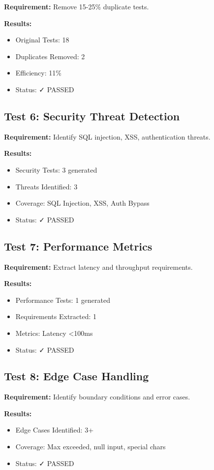 \documentclass[12pt,oneside]{report}
\begin{document}
\textbf{Requirement:} Remove 15-25\% duplicate tests.

\textbf{Results:}
\begin{itemize}
    \item Original Tests: 18
    \item Duplicates Removed: 2
    \item Efficiency: 11\%
    \item Status: ✓ PASSED
\end{itemize}

\subsection{Test 6: Security Threat Detection}

\textbf{Requirement:} Identify SQL injection, XSS, authentication threats.

\textbf{Results:}
\begin{itemize}
    \item Security Tests: 3 generated
    \item Threats Identified: 3
    \item Coverage: SQL Injection, XSS, Auth Bypass
    \item Status: ✓ PASSED
\end{itemize}

\subsection{Test 7: Performance Metrics}

\textbf{Requirement:} Extract latency and throughput requirements.

\textbf{Results:}
\begin{itemize}
    \item Performance Tests: 1 generated
    \item Requirements Extracted: 1
    \item Metrics: Latency <100ms
    \item Status: ✓ PASSED
\end{itemize}

\subsection{Test 8: Edge Case Handling}

\textbf{Requirement:} Identify boundary conditions and error cases.

\textbf{Results:}
\begin{itemize}
    \item Edge Cases Identified: 3+
    \item Coverage: Max exceeded, null input, special chars
    \item Status: ✓ PASSED
\end{itemize}
\end{document}
